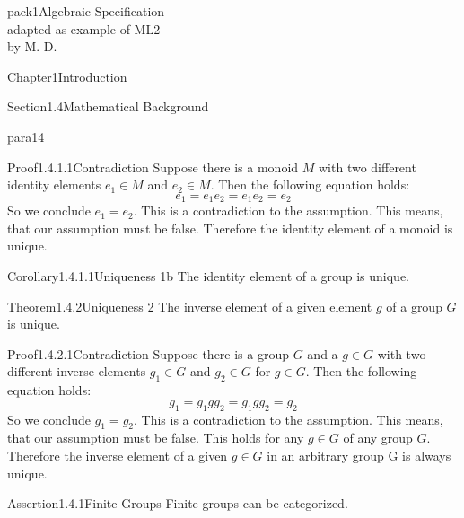 \documentclass[landscape, slides, light]{mmiss2}
\begin{document}
\begin{Package}{pack1}{Algebraic
Specification -- \\ adapted as example of ML2\\ by M. D.}
\begin{Section}{Chapter1}{Introduction}
\begin{Section}{Section1.4}{Mathematical Background}{}
\begin{Paragraph}{para14}{}{}
\begin{Proof}[Algebra]{Proof1.4.1.1}{Contradiction}{}
Suppose there is a monoid $M$ with two different identity elements $e_{1}
\in M$ and $e_{2} \in M$. Then the following equation holds:
\begin{displaymath}
e_{1}=e_{1}e_{2}=e_{1}e_{2}=e_{2}
\end{displaymath}
So we conclude $e_{1}=e_{2}$. This is a contradiction to the
assumption. This means, that our assumption must be false. Therefore
the identity element of a monoid is unique.
\end{Proof}

\begin{Corollary}[Algebra]{Corollary1.4.1.1}{Uniqueness 1b}{}
The identity element of a group is unique.
\end{Corollary}
\newline
\begin{Theorem}[Algebra]{Theorem1.4.2}{Uniqueness 2}{}
The inverse element of a given element $g$ of a group $G$ is unique.
\end{Theorem}

\begin{Proof}[Algebra]{Proof1.4.2.1}{Contradiction}{}
Suppose there is a group $G$ and a $g \in G$  with two different
inverse elements $g_{1} \in G$ and $g_{2} \in G$ for $g \in G$. Then
the following equation holds:
\begin{displaymath}
g_{1}=g_{1}gg_{2}=g_{1}gg_{2}=g_{2}
\end{displaymath}
So we conclude $g_{1}=g_{2}$. This is a contradiction to the
assumption. This means, that our assumption must be false. This holds
for any $g \in G$ of any group $G$. Therefore the inverse element of a
given $g \in G$ in an arbitrary group G is always unique.
\end{Proof}
\newline
\begin{Assertion}[Algebra]{Assertion1.4.1}{Finite Groups}{}
Finite groups can be categorized. 
\end{Assertion}


\end{Paragraph}
\end{Section}
\end{Section}
\end{Package}
\end{document}
